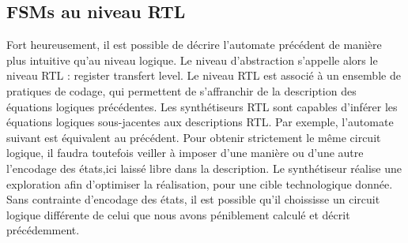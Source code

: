 \subsection{FSMs au niveau RTL}
Fort heureusement, il est possible de décrire l'automate précédent de manière plus intuitive qu'au niveau logique. Le niveau d'abstraction s'appelle alors
le niveau RTL : register transfert level. Le niveau RTL est associé à un ensemble de pratiques de codage, qui permettent de s'affranchir de la description des équations logiques précédentes.
Les synthétiseurs RTL sont capables d'inférer les équations logiques sous-jacentes aux descriptions RTL. Par exemple, l'automate suivant est équivalent au précédent. Pour obtenir strictement le
même circuit logique, il faudra toutefois veiller à imposer d'une manière ou d'une autre l'encodage des états,ici laissé libre dans la description. Le synthétiseur réalise une exploration
afin d'optimiser la réalisation, pour une cible technologique donnée. Sans contrainte d'encodage des états, il est possible qu'il choississe un circuit logique différente de celui que nous avons
péniblement calculé et décrit précédemment.



